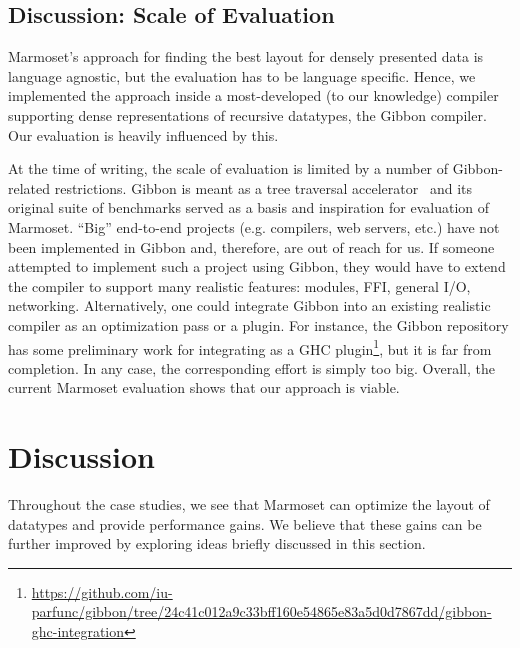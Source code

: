 \documentclass[acmsmall,review,anonymous]{acmart}\settopmatter{printfolios=true,printccs=false,printacmref=false}
\newcommand{\system}{{\sc Marmoset}\xspace}
\begin{document}
\subsection{Discussion: Scale of Evaluation}

\system's approach for finding the best layout for densely presented
data is language agnostic, but the evaluation has to be language specific.
Hence, we implemented the approach inside a most-developed (to our
knowledge) compiler supporting dense representations of recursive datatypes, the
Gibbon compiler. Our evaluation is heavily influenced by this.

At the time of writing, the scale of evaluation is limited by a number of
Gibbon-related restrictions.
Gibbon is meant as a tree traversal accelerator~\cite{gibbon} and
its original suite of benchmarks served as a basis and inspiration for
evaluation of \system.
``Big'' end-to-end projects (e.g. compilers, web servers, etc.)
have not been implemented in Gibbon and, therefore, are out of reach for us.
If someone attempted to implement such a project using Gibbon,
they would have to extend the compiler to support many realistic features:
modules, FFI, general I/O, networking.
Alternatively, one could integrate Gibbon into an existing realistic compiler
as an optimization pass or a plugin.
For instance, the Gibbon repository has some preliminary work for integrating as a
GHC plugin\footnote{\url{https://github.com/iu-parfunc/gibbon/tree/24c41c012a9c33bff160e54865e83a5d0d7867dd/gibbon-ghc-integration}
}, but it is far from completion.
In any case, the corresponding effort is simply too big.
Overall, the current \system evaluation shows that our approach is viable.
\label{subsec:heuristic-tradeoffs}







 \section{Discussion}
\label{sec:discussion}

Throughout the case studies, we see that \system
can optimize the layout of datatypes and provide performance gains. We
believe that these gains can be further improved by exploring ideas briefly discussed
in this section.
\end{document}
